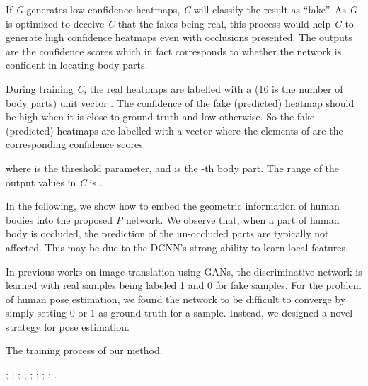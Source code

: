 \documentclass[10pt,letterpaper,twocolumn]{article}
\begin{document}
If \textit{G} generates low-confidence heatmaps, \textit{C} will classify the result as ``fake''. As \textit{G} is optimized to deceive \textit{C} that the fakes being real, this process would help \textit{G} to generate high confidence heatmaps even with occlusions presented. The outputs are the confidence scores  which in fact corresponds to whether the network is confident in locating body parts.

During training \textit{C}, the real heatmaps are labelled with  a  (16 is the number of body parts) unit vector . The confidence of the fake (predicted) heatmap should be high when it is close to ground truth and low otherwise. So the fake (predicted) heatmaps are labelled with a    vector  where the elements of  are the corresponding confidence scores.

where  is the threshold parameter, and  is the -th body part. The range of the output values in \textit{C} is .

In the following, we show how to embed the geometric information of human bodies into the proposed \textit{P} network. We observe that, when a part of human body is occluded, the prediction of the un-occluded parts are typically not affected. This may be due to the DCNN's strong ability to learn local features.

In previous works on image translation using GANs, the discriminative network is learned with  real samples being labeled 1 and 0 for fake samples.
For the problem of human pose estimation, we found the network to be difficult to converge by simply setting 0 or 1 as ground truth for a sample. Instead, we designed a novel strategy for pose estimation.

\begin{algorithm}[h!]
\caption{The training process of our method.}
\label{alg:The-training-process}
\small
\begin{algorithmic}[1]{
;
;
;
;
;
;
;
;
.
}\end{algorithmic}
\end{algorithm}
\end{document}
